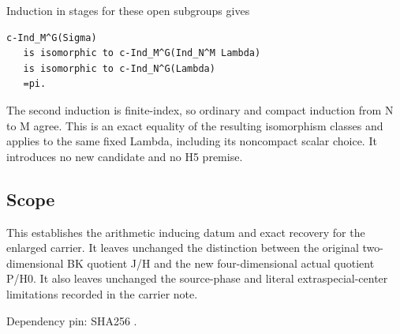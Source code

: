 Induction in stages for these open subgroups gives

\begin{Verbatim}[fontsize=\small,breaklines=true,breakanywhere=true]
c-Ind_M^G(Sigma)
   is isomorphic to c-Ind_M^G(Ind_N^M Lambda)
   is isomorphic to c-Ind_N^G(Lambda)
   =pi.
\end{Verbatim}

The second induction is finite-index, so ordinary and compact induction
from N to M agree. This is an exact equality of the resulting
isomorphism classes and applies to the same fixed Lambda, including its
noncompact scalar choice. It introduces no new candidate and no H5
premise.

\hypertarget{rank~4_stages-scope}{%
\subsection{Scope}\label{rank~4_stages-scope}}

This establishes the arithmetic inducing datum and exact recovery for
the enlarged carrier. It leaves unchanged the distinction between the
original two-dimensional BK quotient J/H and the new four-dimensional
actual quotient P/H0. It also leaves unchanged the source-phase and
literal extraspecial-center limitations recorded in the carrier note.

Dependency pin:  SHA256
.

